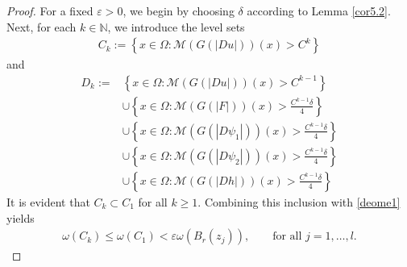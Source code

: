 \documentclass[10pt,a4paper]{article}
\theoremstyle{definition}
\numberwithin{equation}{section}
\begin{document}
 
 \begin{proof}
 For a fixed $\varepsilon>0$, we begin by choosing $\delta$ according to Lemma \ref{cor5.2}. Next, for each $k\in\mathbb{N}$, we introduce the level sets
 	\begin{align*}
 		C_k
 		:=
 		\left\{
 		x\in\Omega:
 		\mathcal{M}(G(|Du|))(x)>C^k
 		\right\}
 	\end{align*}
 	and
 	\begin{align*}
 		D_k
 		:=&
 		\left\{
 		x\in\Omega:
 		\mathcal{M}(G(|Du|))(x)>C^{k-1}
 		\right\}
 		\nonumber\\
 		&\cup
 		\left\{
 		x\in\Omega:
 		\mathcal{M}(G(|F|))(x)>\frac{C^{k-1}\delta}{4}
 		\right\}
 		\nonumber\\
 		&\cup
 		\left\{
 		x\in\Omega:
 		\mathcal{M}(G(|D\psi_1|))(x)>\frac{C^{k-1}\delta}{4}
 		\right\} 
 			\nonumber\\
 		&\cup
 		\left\{
 		x\in\Omega:
 		\mathcal{M}(G(|D\psi_2|))(x)>\frac{C^{k-1}\delta}{4}
 		\right\}
 			\nonumber\\
 		&\cup
 		\left\{
 		x\in\Omega:
 		\mathcal{M}(G(|Dh|))(x)>\frac{C^{k-1}\delta}{4}
 		\right\}
 	\end{align*}
 	It is evident that $C_k\subset C_1$ for all $k\geq1$. Combining this inclusion with \eqref{deome1} yields
 	\begin{align*}
 		\omega(C_k)
 		\leq
 		\omega(C_1)
 		<
 		\varepsilon\omega(B_r(z_j)),
 		\qquad
 		\text{for all }j=1,\ldots,l .
 	\end{align*}
 	


\end{proof}
\end{document}
